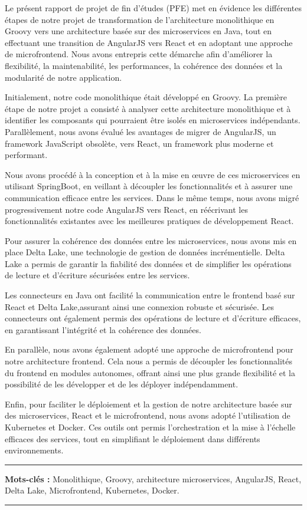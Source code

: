 \resume

Le présent rapport de projet de fin d'études (PFE) met en évidence les différentes étapes de notre projet de transformation de l'architecture monolithique en Groovy vers une architecture basée sur des microservices en Java, tout en effectuant une transition de AngularJS vers React et en adoptant une approche de microfrontend. Nous avons entrepris cette démarche afin d'améliorer la flexibilité, la maintenabilité, les performances, la cohérence des données et la modularité de notre application.
\medskip

Initialement, notre code monolithique était développé en Groovy. La première étape de notre projet a consisté à analyser cette architecture monolithique et à identifier les composants qui pourraient être isolés en microservices indépendants. Parallèlement, nous avons évalué les avantages de migrer de AngularJS, un framework JavaScript obsolète, vers React, un framework plus moderne et performant.

\medskip
Nous avons procédé à la conception et à la mise en œuvre de ces microservices en utilisant SpringBoot, en veillant à découpler les fonctionnalités et à assurer une communication efficace entre les services. Dans le même temps, nous avons migré progressivement notre code AngularJS vers React, en réécrivant les fonctionnalités existantes avec les meilleures pratiques de développement React.
\medskip

Pour assurer la cohérence des données entre les microservices, nous avons mis en place Delta Lake, une technologie de gestion de données incrémentielle. Delta Lake a permis de garantir la fiabilité des données et de simplifier les opérations de lecture et d'écriture sécurisées entre les services.

\medskip
Les connecteurs en Java ont facilité la communication entre le frontend basé sur React et Delta Lake,assurant ainsi une connexion robuste et sécurisée. Les connecteurs ont également permis des opérations de lecture et d'écriture efficaces, en garantissant l'intégrité et la cohérence des données.

\medskip

En parallèle, nous avons également adopté une approche de microfrontend pour notre architecture frontend. Cela nous a permis de découpler les fonctionnalités du frontend en modules autonomes, offrant ainsi une plus grande flexibilité et la possibilité de les développer et de les déployer indépendamment.
\medskip

Enfin, pour faciliter le déploiement et la gestion de notre architecture basée sur des microservices, React et le microfrontend, nous avons adopté l'utilisation de Kubernetes et Docker. Ces outils ont permis l'orchestration et la mise à l'échelle efficaces des services, tout en simplifiant le déploiement dans différents environnements.

\noindent\rule[2pt]{\textwidth}{0.5pt}
{\textbf{Mots-clés :}}
Monolithique, Groovy, architecture microservices, AngularJS, React, Delta Lake, Microfrontend, Kubernetes, Docker.
\\
\noindent\rule[2pt]{\textwidth}{0.5pt}

\clearpage

